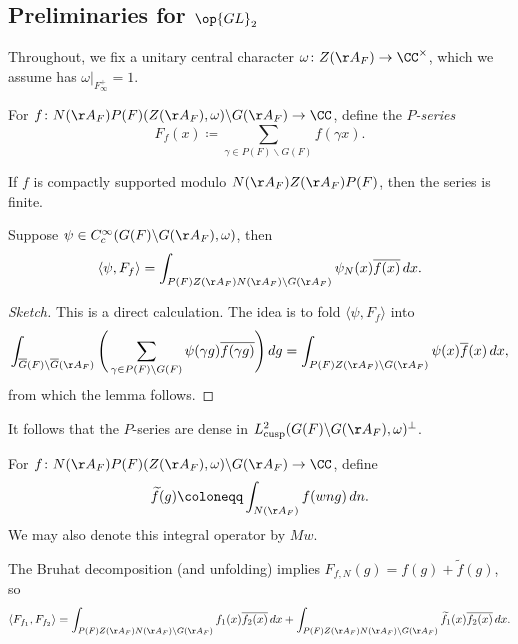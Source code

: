 \documentclass{article}
\begin{document}


\subsection{Preliminaries for \texorpdfstring{$\op{GL}_2$}{GL(2)}}
\begin{notation}
	Throughout, we fix a unitary central character $\omega\colon Z(\AA_F)\to\CC^\times$, which we assume has $\omega|_{F_\infty^+}=1$.
\end{notation}
\begin{definition}[$P$-series]
	For $f\colon N(\AA_F)P(F)(Z(\AA_F),\omega)\backslash G(\AA_F)\to\CC$, define the \textit{$P$-series}
	\[F_f(x)\coloneqq\sum_{\gamma\in P(F)\backslash G(F)}f(\gamma x).\]
\end{definition}
\begin{remark}
	If $f$ is compactly supported modulo $N(\AA_F)Z(\AA_F)P(F)$, then the series is finite.
\end{remark}
\begin{lemma}
	Suppose $\psi\in C_c^\infty(G(F)\backslash G(\AA_F),\omega)$, then
	\[\langle\psi,F_f\rangle=\int_{P(F)Z(\AA_F)N(\AA_F)\backslash G(\AA_F)}\psi_N(x)\overline{f(x)}\,dx.\]
\end{lemma}
\begin{proof}[Sketch]
	This is a direct calculation. The idea is to fold $\langle\psi,F_f\rangle$ into
	\[\int_{\overline G(F)\backslash\overline G(\AA_F)}\Bigg(\sum_{\gamma\in P(F)\backslash G(F)}\psi(\gamma g)\overline{f(\gamma g)}\Bigg)\,dg=\int_{P(F)Z(\AA_F)\backslash G(\AA_F)}\psi(x)\overline f(x)\,dx,\]
	from which the lemma follows.
\end{proof}
\begin{remark}
	It follows that the $P$-series are dense in $L^2_{\mathrm{cusp}}(G(F)\backslash G(\AA_F),\omega)^\perp$.
\end{remark}
\begin{notation}
	For $f\colon N(\AA_F)P(F)(Z(\AA_F),\omega)\backslash G(\AA_F)\to\CC$, define
	\[\widetilde f(g)\coloneqq\int_{N(\AA_F)}f(wng)\,dn.\]
	We may also denote this integral operator by $Mw$.
\end{notation}
\begin{remark}
	The Bruhat decomposition (and unfolding) implies $F_{f,N}(g)=f(g)+\widetilde f(g)$, so
	\[\langle F_{f_1},F_{f_2}\rangle=\int_{P(F)Z(\AA_F)N(\AA_F)\backslash G(\AA_F)}f_1(x)\overline{f_2(x)}\,dx+\int_{P(F)Z(\AA_F)N(\AA_F)\backslash G(\AA_F)}\widetilde f_1(x)\overline{f_2(x)}\,dx.\]
\end{remark}
\end{document}
